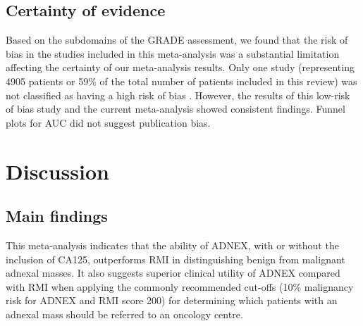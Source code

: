 \subsection{Certainty of evidence}
Based on the subdomains of the \gls{GRADE} assessment, we found that the risk of bias in
the studies included in this meta-analysis was a substantial limitation affecting the
certainty of our meta-analysis results. Only one study (representing 4905 patients or
59\% of the total number of patients included in this review) was not classified as
having a high risk of bias \cite{vancalsterValidationModelsDiagnose2020}. However,
the results of this low-risk of bias study and the current meta-analysis showed
consistent findings. Funnel plots for \gls{AUC} did not suggest publication bias.

\section{Discussion}

\subsection{Main findings}
This meta-analysis indicates that the ability of \gls{ADNEX}, with or without the
inclusion of CA125, outperforms \gls{RMI} in distinguishing benign from malignant adnexal
masses. It also suggests superior clinical utility of \gls{ADNEX} compared with \gls{RMI} when
applying the commonly recommended cut-offs (10\% malignancy risk for \gls{ADNEX} and \gls{RMI}
score 200) for determining which patients with an adnexal mass should be referred to
an oncology centre.

